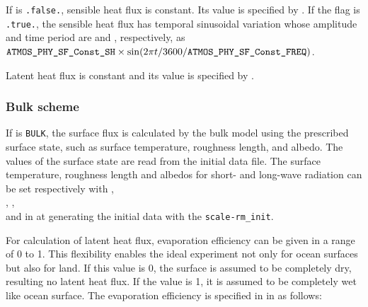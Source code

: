 If  is \verb|.false.|, sensible heat flux is constant.
Its value is specified by .
If the flag is \verb|.true.|, the sensible heat flux has temporal sinusoidal variation whose amplitude and time period are  and , respectively, as \\
$\nmitemeq{ATMOS_PHY_SF_Const_SH} \times \sin(2\pi t/3600/\nmitemeq{ATMOS_PHY_SF_Const_FREQ})$.

Latent heat flux is constant and its value is specified by .




\subsubsection{Bulk scheme}
If  is \verb|BULK|, the surface flux is calculated by the bulk model using the prescribed surface state, such as surface temperature, roughness length, and albedo.
The values of the surface state are read from the initial data file.
The surface temperature, roughness length and albedos for short- and long-wave radiation can be set respectively with , \\ , , \\ and  in  at generating the initial data with the \verb|scale-rm_init|.

For calculation of latent heat flux, evaporation efficiency can be given in a range of 0 to 1.
This flexibility enables the ideal experiment not only for ocean surfaces but also for land.
If this value is 0, the surface is assumed to be completely dry, resulting no latent heat flux.
If the value is 1, it is assumed to be completely wet like ocean surface.
The evaporation efficiency is specified in  in  as follows:



